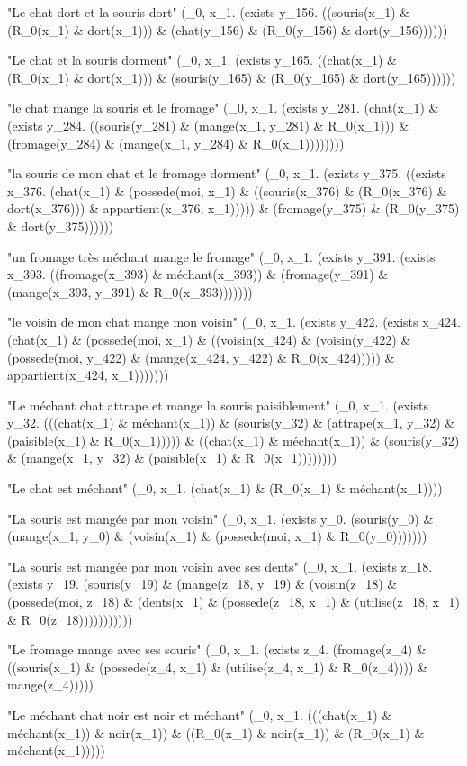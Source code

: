 \documentclass[12pt]{article}
\theoremstyle{exostyle}
\begin{document}
\begin{spverbatim}
"Le chat dort et la souris dort"
 (\R_0, x_1. (exists y_156. ((souris(x_1) & (R_0(x_1) & dort(x_1))) & (chat(y_156) & (R_0(y_156) & dort(y_156))))))

"Le chat et la souris dorment"
 (\R_0, x_1. (exists y_165. ((chat(x_1) & (R_0(x_1) & dort(x_1))) & (souris(y_165) & (R_0(y_165) & dort(y_165))))))

"le chat mange la souris et le fromage"
 (\R_0, x_1. (exists y_281. (chat(x_1) & (exists y_284. ((souris(y_281) & (mange(x_1, y_281) & R_0(x_1))) & (fromage(y_284) & (mange(x_1, y_284) & R_0(x_1))))))))

"la souris de mon chat et le fromage dorment"
 (\R_0, x_1. (exists y_375. ((exists x_376. (chat(x_1) & (possede(moi, x_1) & ((souris(x_376) & (R_0(x_376) & dort(x_376))) & appartient(x_376, x_1))))) & (fromage(y_375) & (R_0(y_375) & dort(y_375))))))

"un fromage très méchant mange le fromage"
 (\R_0, x_1. (exists y_391. (exists x_393. ((fromage(x_393) & méchant(x_393)) & (fromage(y_391) & (mange(x_393, y_391) & R_0(x_393)))))))

"le voisin de mon chat mange mon voisin"
 (\R_0, x_1. (exists y_422. (exists x_424. (chat(x_1) & (possede(moi, x_1) & ((voisin(x_424) & (voisin(y_422) & (possede(moi, y_422) & (mange(x_424, y_422) & R_0(x_424))))) & appartient(x_424, x_1)))))))

"Le méchant chat attrape et mange la souris paisiblement"
 (\R_0, x_1. (exists y_32. (((chat(x_1) & méchant(x_1)) & (souris(y_32) & (attrape(x_1, y_32) & (paisible(x_1) & R_0(x_1))))) & ((chat(x_1) & méchant(x_1)) & (souris(y_32) & (mange(x_1, y_32) & (paisible(x_1) & R_0(x_1))))))))

"Le chat est méchant"
 (\R_0, x_1. (chat(x_1) & (R_0(x_1) & méchant(x_1))))

"La souris est mangée par mon voisin"
 (\R_0, x_1. (exists y_0. (souris(y_0) & (mange(x_1, y_0) & (voisin(x_1) & (possede(moi, x_1) & R_0(y_0)))))))

"La souris est mangée par mon voisin avec ses dents"
 (\R_0, x_1. (exists z_18. (exists y_19. (souris(y_19) & (mange(z_18, y_19) & (voisin(z_18) & (possede(moi, z_18) & (dents(x_1) & (possede(z_18, x_1) & (utilise(z_18, x_1) & R_0(z_18)))))))))))

"Le fromage mange avec ses souris"
 (\R_0, x_1. (exists z_4. (fromage(z_4) & ((souris(x_1) & (possede(z_4, x_1) & (utilise(z_4, x_1) & R_0(z_4)))) & mange(z_4)))))

"Le méchant chat noir est noir et méchant"
 (\R_0, x_1. (((chat(x_1) & méchant(x_1)) & noir(x_1)) & ((R_0(x_1) & noir(x_1)) & (R_0(x_1) & méchant(x_1)))))


\end{spverbatim}
\end{document}

